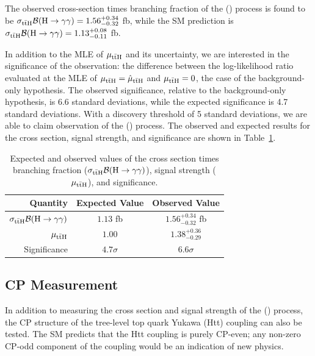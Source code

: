 The observed cross-section times branching fraction of the \ttH (\Hgg) process is found to be $\sigma_{\mathrm{t\bar{t}H}} \mathcal B(\text{H} \to \gamma \gamma) = 1.56^{+0.34}_{-0.32}$ fb, while the SM prediction is $\sigma_{\mathrm{t\bar{t}H}} \mathcal B(\text{H} \to \gamma \gamma) = 1.13^{+0.08}_{-0.11}$ fb.

In addition to the MLE of $\mu_{\mathrm{t\bar{t}H}}$ and its uncertainty, we are interested in the significance of the observation: the difference between the log-likelihood ratio evaluated at the MLE of $\mu_{\mathrm{t\bar{t}H}} = \hat{\mu}_{\mathrm{t\bar{t}H}}$ and $\mu_{\mathrm{t\bar{t}H}} = 0$, the case of the background-only hypothesis.
The observed significance, relative to the background-only hypothesis, is 6.6 standard deviations, while the expected significance is 4.7 standard deviations.
With a discovery threshold of 5 standard deviations, we are able to claim observation of the \ttH (\Hgg) process.
The observed and expected results for the cross section, signal strength, and significance are shown in Table~\ref{tab:tth_results}.
\begin{table} [htbp!]
    \centering
    \begin{tabular}{r c c} \hline \hline
        Quantity & Expected Value & Observed Value \\ \hline
        $\sigma_{\mathrm{t\bar{t}H}} \mathcal B(\text{H} \to \gamma \gamma)$ & $1.13$ fb & $1.56^{+0.34}_{-0.32}$ fb \\
        $\mu_{\mathrm{t\bar{t}H}}$ & $1.00$ & $1.38^{+0.36}_{-0.29}$ \\
        Significance & $4.7\sigma$ & $6.6\sigma$ \\ \hline \hline
    \end{tabular}
    \caption{Expected and observed values of the cross section times branching fraction ($\sigma_{\mathrm{t\bar{t}H}} \mathcal B(\text{H} \to \gamma \gamma)$), signal strength ($\mu_{\mathrm{t\bar{t}H}}$), and significance.}
    \label{tab:tth_results}
\end{table}

\subsection{CP Measurement}
In addition to measuring the cross section and signal strength of the \ttH (\Hgg) process, the CP structure of the tree-level top quark Yukawa (Htt) coupling can also be tested.
The SM predicts that the Htt coupling is purely CP-even; any non-zero CP-odd component of the coupling would be an indication of new physics.

